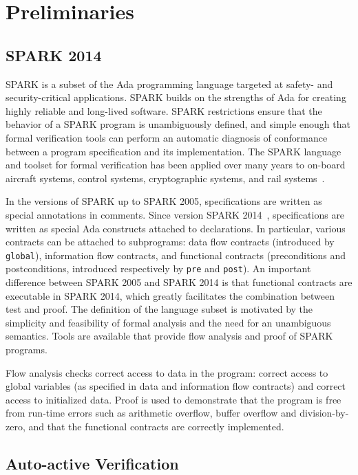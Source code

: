 \documentclass[11pt,a4paper]{article}
\newcommand{\spark}{SPARK\xspace}
\begin{document}
\section{Preliminaries}
\subsection{\spark 2014}

\spark is a subset of the Ada programming language targeted at safety-
and security-critical applications. \spark builds on the strengths of
Ada for creating highly reliable and long-lived software. \spark
restrictions ensure that the behavior of a \spark program is
unambiguously defined, and simple enough that formal verification
tools can perform an automatic diagnosis of conformance between a
program specification and its implementation. The \spark language and
toolset for formal verification has been applied over many years to
on-board aircraft systems, control systems, cryptographic systems, and
rail systems~\cite{sparkbook2012,oneill2012}.

In the versions of \spark up to \spark 2005, specifications are written as
special annotations in comments. Since version \spark 2014~\cite{sparkERTS2014},
specifications are written as special Ada constructs attached to
declarations. In particular, various contracts can be attached to subprograms:
data flow contracts (introduced by \texttt{global}), information flow
contracts, and functional contracts (preconditions and postconditions,
introduced respectively by \texttt{pre} and \texttt{post}). An important
difference between \spark 2005 and \spark 2014 is that functional contracts are
executable in \spark 2014, which greatly facilitates the combination between
test and proof. The definition of the language subset is motivated by the
simplicity and feasibility of formal analysis and the need for an unambiguous
semantics. Tools are available that provide flow analysis and proof of \spark
programs.

Flow analysis checks correct access to data in the program: correct access to
global variables (as specified in data and information flow contracts) and
correct access to initialized data. Proof is used to demonstrate that the
program is free from run-time errors such as arithmetic overflow, buffer
overflow and division-by-zero, and that the functional contracts are correctly
implemented.

\subsection{Auto-active Verification}
\label{sec-prelim-auto-active}
\end{document}
